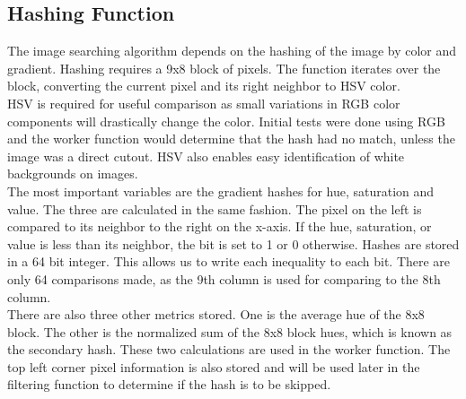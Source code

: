 \documentclass[10pt, journal]{vgtc}                %
\newcommand\tab[1][1cm]{\hspace*{#1}}
\begin{document}
\subsection{Hashing Function}
\begin{flushleft}
	\tab The image searching algorithm depends on the hashing of the image by color and gradient. Hashing requires a 9x8 block of pixels. The function iterates over the block, converting the current pixel and its right neighbor to HSV color. \\\smallskip
\tab HSV is required for useful comparison as small variations in RGB color components will drastically change the color. Initial tests were done using RGB and the worker function would determine that the hash had no match, unless the image was a direct cutout. HSV also enables easy identification of white backgrounds on images.\\\smallskip
\tab The most important variables are the gradient hashes for hue, saturation and value. The three are calculated in the same fashion. The pixel on the left is compared to its neighbor to the right on the x-axis. If the hue, saturation, or value is less than its neighbor, the bit is set to 1 or 0 otherwise. Hashes are stored in a 64 bit integer. This allows us to write each inequality to each bit. There are only 64 comparisons made, as the 9th column is used for comparing to the 8th column.\\\smallskip
\tab There are also three other metrics stored. One is the average hue of the 8x8 block. The other is the normalized sum of the 8x8 block hues, which is known as the secondary hash. These two calculations are used in the worker function. The top left corner pixel information is also stored and will be used later in the filtering function to determine if the hash is to be skipped.
\end{flushleft}
\end{document}
